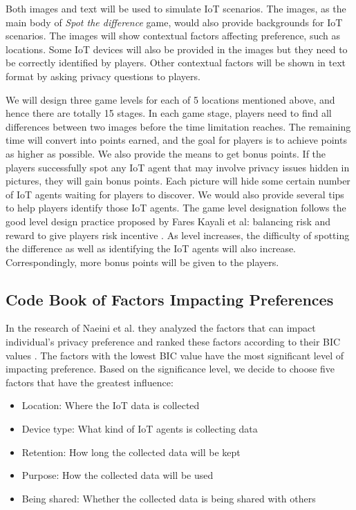 \documentclass[a4paper,11pt]{article}
\begin{document}
Both images and text will be used to simulate IoT scenarios. The images, as the main body of \textit{Spot the difference} game, would also provide backgrounds for IoT scenarios. The images will show contextual factors affecting preference, such as locations. Some IoT devices will also be provided in the images but they need to be correctly identified by players. Other contextual factors will be shown in text format by asking privacy questions to players.

We will design three game levels for each of 5 locations mentioned above, and hence there are totally 15 stages. In each game stage, players need to find all differences between two images before the time limitation reaches. The remaining time will convert into points earned, and the goal for players is to achieve points as higher as possible. We also provide the means to get bonus points. If the players successfully spot any IoT agent that may involve privacy issues hidden in pictures, they will gain bonus points. Each picture will hide some certain number of IoT agents waiting for players to discover. We would also provide several tips to help players identify those IoT agents. The game level designation follows the good level design practice proposed by Fares Kayali et al: balancing risk and reward to give players risk incentive \cite{Kayali}. As level increases, the difficulty of spotting the difference as well as identifying the IoT agents will also increase. Correspondingly, more bonus points will be given to the players.

\subsection{Code Book of Factors Impacting Preferences}

In the research of Naeini et al. they analyzed the factors that can impact individual's privacy preference and ranked these factors according to their BIC values \cite{Naeini:2017}. The factors with the lowest BIC value have the most significant level of impacting preference. Based on the significance level, we decide to choose five factors that have the greatest influence:
\begin{itemize}
\item Location: Where the IoT data is collected
\item Device type: What kind of IoT agents is collecting data
\item Retention: How long the collected data will be kept
\item Purpose: How the collected data will be used
\item Being shared: Whether the collected data is being shared with others
\end{itemize}
\end{document}
